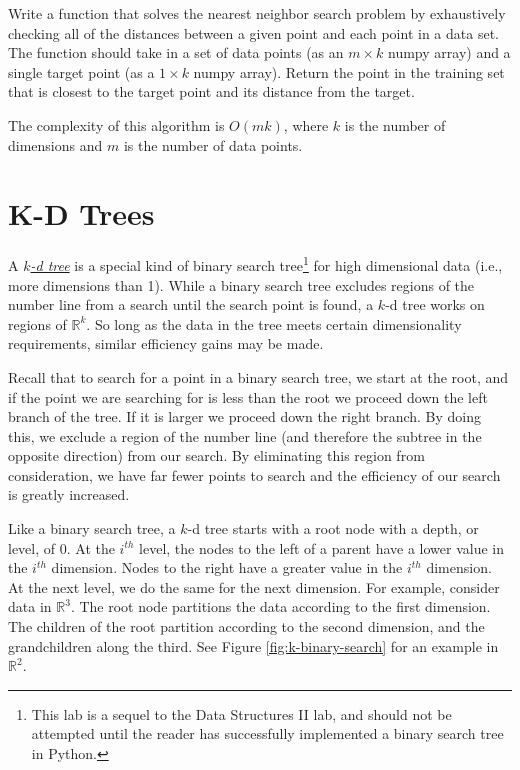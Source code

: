 \begin{problem}
Write a function that solves the nearest neighbor search problem by exhaustively checking all of the distances between a given point and each point in a data set.
The function should take in a set of data points (as an $m \times k$ numpy array) and a single target point (as a $1 \times k$ numpy array).
Return the point in the training set that is closest to the target point and its distance from the target.

The complexity of this algorithm is $O(mk)$, where $k$ is the number of dimensions and $m$ is the number of data points.
\end{problem}

\section*{K-D Trees}

A \href{https://en.wikipedia.org/wiki/K-d_tree}{\emph{$k$-d tree}} is a special kind of binary search tree\footnote{This lab is a sequel to the Data Structures II lab, and should not be attempted until the reader has successfully implemented a binary search tree in Python.} for high dimensional data (i.e., more dimensions than 1).
While a binary search tree excludes regions of the number line from a search until the search point is found, a $k$-d tree works on regions of $\mathbb{R}^k$.
So long as the data in the tree meets certain dimensionality requirements, similar efficiency gains may be made.

Recall that to search for a point in a binary search tree, we start at the root, and if the point we are searching for is less than the root we proceed down the left branch of the tree.
If it is larger we proceed down the right branch.
By doing this, we exclude a region of the number line (and therefore the subtree in the opposite direction) from our search.
By eliminating this region from consideration, we have far fewer points to search and the efficiency of our search is greatly increased.

Like a binary search tree, a $k$-d tree starts with a root node with a depth, or level, of 0.
At the $i^{th}$ level, the nodes to the left of a parent have a lower value in the $i^{th}$ dimension.
Nodes to the right have a greater value in the $i^{th}$ dimension.
At the next level, we do the same for the next dimension.
For example, consider data in $\mathbb{R}^3$.
The root node partitions the data according to the first dimension.
The children of the root partition according to the second dimension, and the grandchildren along the third.
See Figure \ref{fig:k-binary-search} for an example in $\mathbb{R}^2$.

